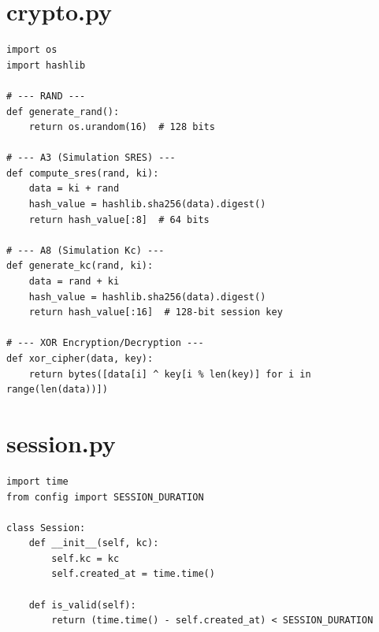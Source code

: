\documentclass[12pt,a4paper]{report}
\begin{document}
\section{crypto.py}
\begin{verbatim}
import os
import hashlib

# --- RAND ---
def generate_rand():
    return os.urandom(16)  # 128 bits

# --- A3 (Simulation SRES) ---
def compute_sres(rand, ki):
    data = ki + rand
    hash_value = hashlib.sha256(data).digest()
    return hash_value[:8]  # 64 bits

# --- A8 (Simulation Kc) ---
def generate_kc(rand, ki):
    data = rand + ki
    hash_value = hashlib.sha256(data).digest()
    return hash_value[:16]  # 128-bit session key

# --- XOR Encryption/Decryption ---
def xor_cipher(data, key):
    return bytes([data[i] ^ key[i % len(key)] for i in range(len(data))])
\end{verbatim}

\section{session.py}
\begin{verbatim}
import time
from config import SESSION_DURATION

class Session:
    def __init__(self, kc):
        self.kc = kc
        self.created_at = time.time()

    def is_valid(self):
        return (time.time() - self.created_at) < SESSION_DURATION
\end{verbatim}
\end{document}
